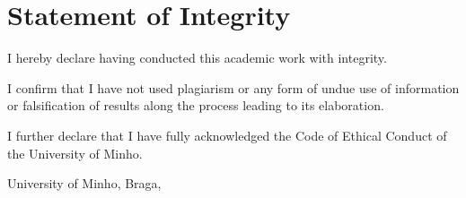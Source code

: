 \chapter*{Statement of Integrity}
\setlength{\parskip}{1em}
\noindent
I hereby declare having conducted this academic work with integrity.

\noindent
I confirm that I have not used plagiarism or any form of undue use of information or falsification of results along the process leading to its elaboration.

\noindent
I further declare that I have fully acknowledged the Code of Ethical Conduct of the University of Minho.

\phantom{space}

\noindent
University of Minho, Braga, \myear

\vspace{25mm}
\noindent\theauthor
\setlength{\parskip}{0em}